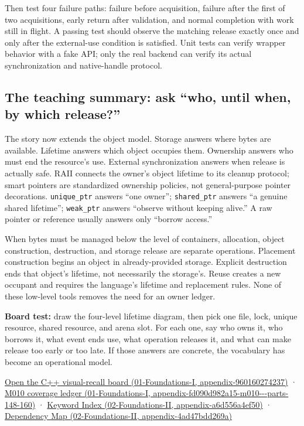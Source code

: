 Then test four failure paths: failure before acquisition, failure after the first of two acquisitions, early return after validation, and normal completion with work still in flight. A passing test should observe the matching release exactly once and only after the external-use condition is satisfied. Unit tests can verify wrapper behavior with a fake API; only the real backend can verify its actual synchronization and native-handle protocol.

\subsection{The teaching summary: ask ``who, until when, by which release?''}\label{05-engine-i-ch004-the-teaching-summary-ask-who-until-when-by-which-release}

The story now extends the object model. Storage answers where bytes are available. Lifetime answers which object occupies them. Ownership answers who must end the resource's use. External synchronization answers when release is actually safe. RAII connects the owner's object lifetime to its cleanup protocol; smart pointers are standardized ownership policies, not general-purpose pointer decorations. \texttt{unique\_ptr} answers ``one owner''; \texttt{shared\_ptr} answers ``a genuine shared lifetime''; \texttt{weak\_ptr} answers ``observe without keeping alive.'' A raw pointer or reference usually answers only ``borrow access.''

When bytes must be managed below the level of containers, allocation, object construction, destruction, and storage release are separate operations. Placement construction begins an object in already-provided storage. Explicit destruction ends that object's lifetime, not necessarily the storage's. Reuse creates a new occupant and requires the language's lifetime and replacement rules. None of these low-level tools removes the need for an owner ledger.

\textbf{Board test:} draw the four-level lifetime diagram, then pick one file, lock, unique resource, shared resource, and arena slot. For each one, say who owns it, who borrows it, what event ends use, what operation releases it, and what can make release too early or too late. If those answers are concrete, the vocabulary has become an operational model.

\href{../01-Foundations-I/main.pdf\#nameddest=appendix-960160274237}{Open the C++ visual-recall board (01-Foundations-I, appendix-960160274237)} · \href{../01-Foundations-I/main.pdf\#nameddest=appendix-fd090d982a15-m010---parts-148-160}{M010 coverage ledger (01-Foundations-I, appendix-fd090d982a15-m010-\/-\/-parts-148-160)} · \href{../02-Foundations-II/main.pdf\#nameddest=appendix-a6d556a4ef50}{Keyword Index (02-Foundations-II, appendix-a6d556a4ef50)} · \href{../02-Foundations-II/main.pdf\#nameddest=appendix-4ad47bdd269a}{Dependency Map (02-Foundations-II, appendix-4ad47bdd269a)}

